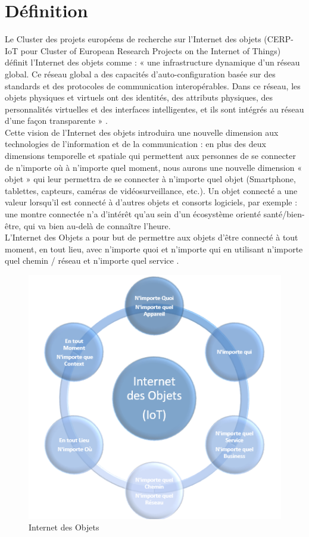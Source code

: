 \section{Déf{\kern0pt}inition}
Le Cluster des projets européens de recherche sur l'Internet des objets (CERP-IoT pour Cluster of European Research Projects on the Internet of Things) déf{\kern0pt}init l’Internet des objets comme : « une infrastructure dynamique d’un réseau global. Ce réseau global a des capacités d’auto-conf{\kern0pt}iguration basée sur des standards et des protocoles de communication interopérables. Dans ce réseau, les objets physiques et virtuels ont des identités, des attributs physiques, des personnalités virtuelles et des interfaces intelligentes, et ils sont intégrés au réseau d’une façon transparente » \cite{sundmaeker2010vision}.\\
Cette vision de l’Internet des objets introduira une nouvelle dimension aux technologies de l’information et de la communication : en plus des deux dimensions temporelle et spatiale qui permettent aux personnes de se connecter de n’importe où à n’importe quel moment, nous aurons une nouvelle dimension « objet » qui leur permettra de se connecter à n’importe quel objet \cite{challal2012securite} (Smartphone, tablettes, capteurs, caméras de vidéosurveillance, etc.). Un objet connecté a une valeur lorsqu’il est connecté à d’autres objets et consorts logiciels, par exemple : une montre connectée n’a d’intérêt qu’au sein d’un écosystème orienté santé/bien-être, qui va bien au-delà de connaître l’heure.\\

L’Internet des Objets a pour but de permettre aux objets d’être connecté à tout moment, en tout lieu, avec n’importe quoi et n’importe qui en utilisant n’importe quel chemin / réseau et n’importe quel service \cite{patel2016iot}.\\

\begin{figure}[H]
	\begin{center}
		\includegraphics{IMAGES/ORIGINALS/Internet_des_Objets}
	\end{center}
	\caption{Internet des Objets}
\end{figure}

